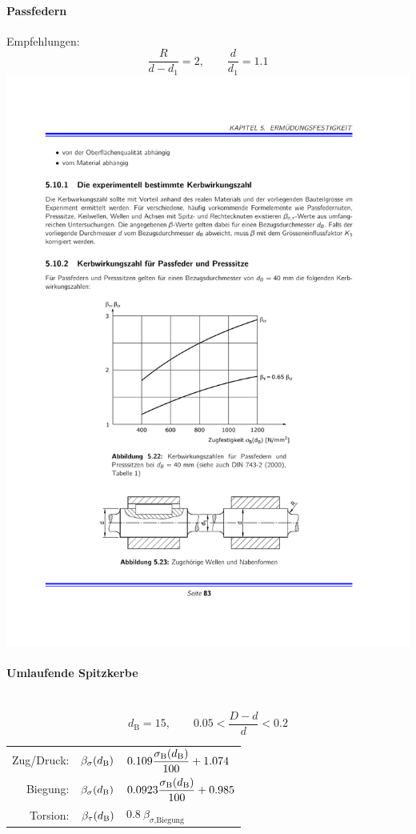 		\paragraph{Passfedern}
		Empfehlungen:
		\begin{equation*}
			\frac{R}{d-d_1} = 2, \qquad \frac{d}{d_1}=1.1
		\end{equation*}
		\includegraphics[width=\columnwidth]{graphics/passfedern}
		
		\paragraph{Umlaufende Spitzkerbe}~\\
		\begin{equation*}
			d_{\text{B}}=15, \qquad 0.05<\frac{D-d}{d}<0.2
		\end{equation*}
		\begin{tabular}{rr@{$\:=\:$}l}
			Zug/Druck: & $\beta_\sigma (d_\text B)$ & $\displaystyle 0.109 \frac{\sigma_\text{B}(d_\text B)}{100} + 1.074$ \\[2ex]
			Biegung: & $\beta_\sigma (d_\text B)$ & $\displaystyle 0.0923 \frac{\sigma_\text{B}(d_\text B)}{100}+0.985$ \\[2ex]
			Torsion: & $\beta_\tau (d_\text B)$ & $0.8 \: \beta_{\sigma\text{,Biegung}}$
		\end{tabular}
		
